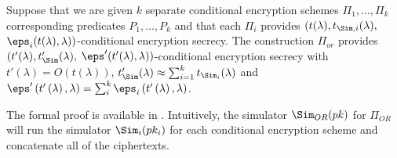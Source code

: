 


\newcommand{\thmORPrivacy}{Suppose that we are given $ k $ separate conditional encryption schemes $ \Pi_1, \ldots, \Pi_k $ corresponding predicates $ P_1, \ldots, P_k $ and that each $\Pi_i$ provides $(t(\lambda), t_{\Sim,i}(\lambda), $ $\eps_i(t(\lambda),\lambda))$-conditional encryption secrecy. The construction $\Pi_{or}$ provides $ (t'(\lambda), t_{\Sim}'(\lambda), $ $\eps'(t'(\lambda), \lambda)) $-conditional encryption secrecy with $ t'(\lambda) = O\left(t\left(\lambda\right)\right)$, $ t'_{\Sim}(\lambda) \approx \sum_{i = 1}^{k} t_{\Sim_i}(\lambda) $ and $ \eps'\left(t'\left(\lambda\right),\lambda\right) = \sum_{i}^k \eps_i\left(t'\left(\lambda\right),\lambda\right)$. }


\begin{theorem}{}
     \thmORPrivacy
\end{theorem} 


The formal proof is available in . Intuitively, the simulator $\Sim_{OR}(pk)$ for $\Pi_{OR}$ will run the simulator $\Sim_i(pk_i)$ for each conditional encryption scheme and concatenate all of the ciphertexts. 




